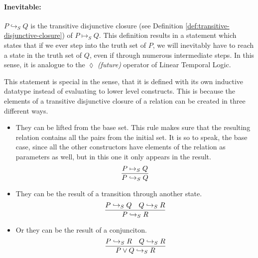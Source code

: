 \paragraph{Inevitable:}
$P \hookrightarrow_S Q$ is the transitive disjunctive closure (see Definition \ref{def:transitive-disjunctive-closure}) of $P \mapsto_S Q$. This definition results in a statement which states that if we ever step into the truth set of $P$, we will inevitably have to reach a state in the truth set of $Q$, even if through numerous intermediate steps. In this sense, it is analogue to the $\lozenge$ \textit{(future)} operator of Linear Temporal Logic.

This statement is special in the sense, that it is defined with its own inductive datatype instead of evaluating to lower level constructs. This is because the elements of a transitive disjunctive closure of a relation can be created in three different ways.

\begin{itemize}
    \item They can be lifted from the base set. This rule makes sure that the resulting relation contains all the pairs from the initial set. It is so to speak, the base case, since all the other constructors have elements of the relation as parameters as well, but in this one it only appears in the result.
    \begin{equation}
        \label{eq:leadsto-fromensures}
        \infer{P \hookrightarrow_S Q}{P \mapsto_S Q}
    \end{equation}

    \item They can be the result of a transition through another state.
    \begin{equation}
        \label{eq:leadsto-transitivity}
        \infer{P \hookrightarrow_S R}{P \hookrightarrow_S Q & Q \hookrightarrow_S R}
    \end{equation}

    \item Or they can be the result of a conjunciton.
    \begin{equation}
        \label{eq:leadsto-disjunctivity}
        \infer{P \lor Q \hookrightarrow_S R}{P \hookrightarrow_S R & Q \hookrightarrow_S R}
    \end{equation}
\end{itemize}

